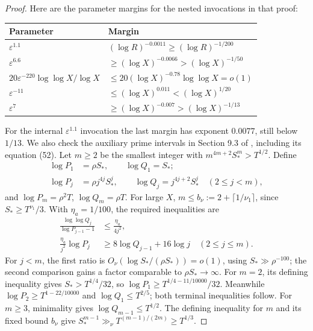 \documentclass[11pt]{article}
\theoremstyle{definition}
\begin{document}
\begin{proof}
Here are the parameter margins for the nested invocations in that proof:
\begin{center}
\begin{tabular}{ll}
\toprule
Parameter & Margin\\
\midrule
$\varepsilon^{1.1}$ & $(\log R)^{-0.0011}\ge(\log R)^{-1/200}$\\
$\varepsilon^{6.6}$ & $\ge(\log X)^{-0.0066}>(\log X)^{-1/50}$\\
$20\varepsilon^{-220}\log\log X/\log X$ &
  $\le20(\log X)^{-0.78}\log\log X=o(1)$\\
$\varepsilon^{-11}$ & $\le(\log X)^{0.011}<(\log X)^{1/20}$\\
$\varepsilon^7$ & $\ge(\log X)^{-0.007}>(\log X)^{-1/13}$\\
\bottomrule
\end{tabular}
\end{center}
For the internal $\varepsilon^{1.1}$ invocation the last margin has
exponent $0.0077$, still below $1/13$.
We also check the auxiliary prime intervals in Section 9.3 of
\cite{KMT}, including its equation (52). Let $m\ge2$ be the smallest
integer with $m^{4m+2}S_*^m>T^{1/2}$. Define
\begin{align*}
 \log P_1&=\rho S_*,\qquad \log Q_1=S_*;\\
 \log P_j&=\rho j^{4j}S_*^j,\qquad
 \log Q_j=j^{4j+2}S_*^j\quad(2\le j<m),
\end{align*}
and $\log P_m=\rho^2T$, $\log Q_m=\rho T$.
For large $X$, $m\le b_\nu:=2+\lceil1/\nu_1\rceil$, since
$S_*\ge T^{\nu_1}/3$. With $\eta_a=1/100$, the required inequalities
are
\begin{equation}\label{eq:kmtintervals}
 \begin{aligned}
 \frac{\log\log Q_j}{\log P_{j-1}-1}&\le\frac{\eta_a}{4j^2},\\
 \frac{\eta_a}{j^2}\log P_j&\ge8\log Q_{j-1}+16\log j
 \quad(2\le j\le m).
 \end{aligned}
\end{equation}
For $j<m$, the first ratio is
$O_\nu(\log S_*/(\rho S_*))=o(1)$, using
$S_*\gg\rho^{-100}$; the second comparison gains a factor comparable
to $\rho S_*\to\infty$.
For $m=2$, its defining inequality gives $S_*>T^{1/4}/32$, so
$\log P_1\ge T^{1/4-11/10000}/32$.
Meanwhile $\log P_2\ge T^{1-22/10000}$ and
$\log Q_1\le T^{2/5}$; both terminal inequalities follow.
For $m\ge3$, minimality gives $\log Q_{m-1}\le T^{1/2}$.
The defining inequality for $m$ and its fixed bound $b_\nu$ give
$S_*^{m-1}\gg_\nu T^{(m-1)/(2m)}\ge T^{1/3}$.

\end{proof}
\end{document}
